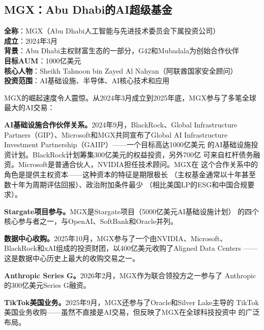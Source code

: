 \subsection{MGX：Abu Dhabi的AI超级基金}
\label{subsec:inv-mgx}

\begin{corebox}
\textbf{全称}：MGX（Abu Dhabi人工智能与先进技术委员会下属投资公司） \\
\textbf{成立}：2024年3月 \\
\textbf{背景}：Abu Dhabi主权财富生态的一部分，G42和Mubadala为创始合作伙伴 \\
\textbf{目标AUM}：1000亿美元 \\
\textbf{核心人物}：Sheikh Tahnoon bin Zayed Al Nahyan（阿联酋国家安全顾问） \\
\textbf{投资范围}：AI基础设施、半导体、AI核心技术和应用
\end{corebox}

MGX的崛起速度令人震惊。从2024年3月成立到2025年底，MGX参与了多笔全球
最大的AI交易：

\textbf{AI基础设施合作伙伴关系。}2024年9月，BlackRock、Global
Infrastructure Partners（GIP）、Microsoft和MGX共同宣布了Global AI
Infrastructure Investment Partnership（GAIIP）——一个目标高达1000亿美元
的AI基础设施投资计划。BlackRock计划筹集300亿美元的权益投资，另外700亿
可来自杠杆债务融资。Microsoft是普通合伙人，NVIDIA担任技术顾问。MGX在
这个合作关系中的角色是提供主权资本——这种资本的特征是期限极长
（主权基金通常以十年甚至数十年为周期评估回报）、政治附加条件最少
（相比美国LP的ESG和中国合规要求）。

\textbf{Stargate项目参与。}MGX是Stargate项目（5000亿美元AI基础设施计划）
的四个核心参与者之一，与OpenAI、SoftBank和Oracle并列。

\textbf{数据中心收购。}2025年10月，MGX参与了一个由NVIDIA、Microsoft、
BlackRock和xAI组成的投资财团，以400亿美元收购了Aligned Data Centers
——这是数据中心历史上最大的收购交易之一。

\textbf{Anthropic Series G。}2026年2月，MGX作为联合领投方之一参与了
Anthropic的300亿美元Series G融资。

\textbf{TikTok美国业务。}2025年9月，MGX还参与了Oracle和Silver Lake主导的
TikTok美国业务收购——虽然不直接是AI交易，但反映了MGX在全球科技投资中
的广泛布局。

